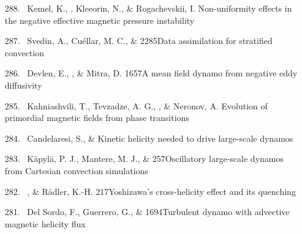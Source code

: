 \begin{itemize}
\item[{288.}~]
Kemel, K., \Brandenburg, Kleeorin, N., \& Rogachevskii, I.
{Non-uniformity effects in the negative effective magnetic pressure instability}

\item[{287.}~]
Svedin, A., Cu\'ellar, M. C., \& \Brandenburg{}
{2285}{Data assimilation for stratified convection}

\item[{286.}~]
Devlen, E., \Brandenburg, \& Mitra, D.
{1657}{A mean field dynamo from negative eddy diffusivity}

\item[{285.}~]
Kahniashvili, T., Tevzadze, A. G., \Brandenburg, \& Neronov, A.
{Evolution of primordial magnetic fields from phase transitions}

\item[{284.}~]
Candelaresi, S., \& \Brandenburg{}
{Kinetic helicity needed to drive large-scale dynamos}

\item[{283.}~]
K\"apyl\"a, P. J., Mantere, M. J., \& \Brandenburg{}
{257}{Oscillatory large-scale dynamos from Cartesian convection simulations}

\item[{282.}~]
\Brandenburg, \& R\"adler, K.-H.
{217}{Yoshizawa's cross-helicity effect and its quenching}

\item[{281.}~]
Del Sordo, F., Guerrero, G., \& \Brandenburg{}
{1694}{Turbulent dynamo with advective magnetic helicity flux}


\end{itemize}
